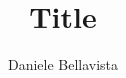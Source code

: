 \documentclass[11pt]{article}
\newcommand{\xauth}{Daniele Bellavista}
\newcommand{\xtitle}{Title}
\begin{document}
\title{\xtitle}
\author{\xauth}

\maketitle

%


\nocite{*}
{}
\end{document}
